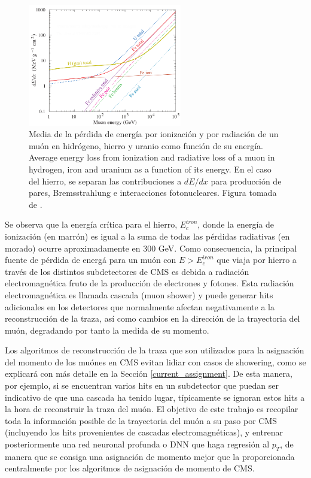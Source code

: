 \begin{figure}
\centering
\includegraphics[width=0.60\textwidth]{figures/dEdx.png}
\caption{Media de la p\'erdida de energ\'ia por ionizaci\'on y por radiaci\'on de un mu\'on en hidr\'ogeno, hierro y uranio como funci\'on de su energ\'ia.  Average energy loss from ionization and radiative loss of a muon in hydrogen, iron and uranium as a function of its energy. En el caso del hierro, se separan las contribuciones a $dE/dx$ para producci\'on de pares, Bremsstrahlung e interacciones fotonucleares. Figura tomada de \cite{Tanabashi:2018oca}.}
\label{fig:dEdX}        
\end{figure}

Se observa que la energ\'ia cr\'itica para el hierro, $E^{iron}_{c}$, donde la energ\'ia de ionizaci\'on (en marr\'on) es igual a la suma de todas las p\'erdidas radiativas (en morado) ocurre aproximadamente en 300 GeV. Como consecuencia, la principal fuente de p\'erdida de energ\'a para un mu\'on con $E>E^{iron}_{c}$ que viaja por hierro a trav\'es de los distintos subdetectores de CMS es debida a radiaci\'on electromagn\'etica fruto de la producci\'on de electrones y fotones. Esta radiaci\'on electromagn\'etica es llamada cascada (muon shower) y puede generar hits adicionales en los detectores que normalmente afectan negativamente a la reconstrucci\'on de la traza, as\'i como cambios en la direcci\'on de la trayectoria del mu\'on, degradando por tanto la medida de su momento.

Los algoritmos de reconstrucci\'on de la traza que son utilizados para la asignaci\'on del momento de los mu\'ones en CMS evitan lidiar con casos de showering, como se explicar\'a con m\'as detalle en la Secci\'on \ref{current_assignment}. De esta manera, por ejemplo, si se encuentran varios hits en un subdetector que puedan ser indicativo de que una cascada ha tenido lugar, t\'ipicamente se ignoran estos hits a la hora de reconstruir la traza del mu\'on. El objetivo de este trabajo es recopilar toda la informaci\'on posible de la trayectoria del mu\'on a su paso por CMS (incluyendo los hits provenientes de cascadas electromagn\'eticas), y entrenar posteriormente una red neuronal profunda o DNN que haga regresi\'on al $p_{T}$, de manera que se consiga una asignaci\'on de momento mejor que la proporcionada centralmente por los algoritmos de asignaci\'on de momento de CMS.

